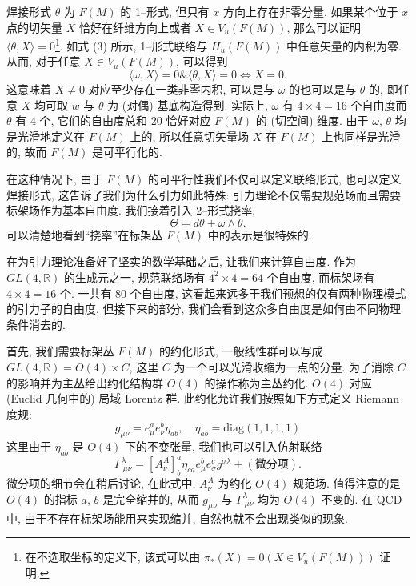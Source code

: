 \documentclass{article}
\begin{document}
焊接形式 $\theta$ 为 $F(M)$ 的 1--形式, 但只有 $x$ 方向上存在非零分量. 如果某个位于 $x$ 点的切矢量 $X$ 恰好在纤维方向上或者 $X\in V_{u}(F(M))$, 那么可以证明 $\langle\theta,X\rangle=0$\footnote{在不选取坐标的定义下, 该式可以由 $\pi_{*}(X)=0(X\in V_{u}(F(M)))$ 证明.}. 如式 (3) 所示, 1--形式联络与 $H_{u}(F(M))$ 中任意矢量的内积为零. 从而, 对于任意 $X\in V_{u}(F(M))$, 可以得到
\begin{equation}
\langle\omega, X\rangle=0\&\langle \theta, X\rangle=0\Leftrightarrow X=0.
\end{equation}
这意味着 $X\neq 0$ 对应至少存在一类非零内积, 可以是与 $\omega$ 的也可以是与 $\theta$ 的, 即任意 $X$ 均可取 $w$ 与 $\theta$ 为 (对偶) 基底构造得到. 实际上, $\omega$ 有 $4\times4=16$ 个自由度而 $\theta$ 有 4 个, 它们的自由度总和 20 恰好对应 $F(M)$ 的 (切空间) 维度. 由于 $\omega$, $\theta$ 均是光滑地定义在 $F(M)$ 上的, 所以任意切矢量场 $X$ 在 $F(M)$ 上也同样是光滑的, 故而 $F(M)$ 是可平行化的.

在这种情况下, 由于 $F(M)$ 的可平行性我们不仅可以定义联络形式, 也可以定义焊接形式, 这告诉了我们为什么引力如此特殊: 引力理论不仅需要规范场而且需要标架场作为基本自由度. 我们接着引入 2--形式挠率,
\begin{equation}
\Theta=d\theta+\omega\wedge \theta.
\end{equation}
可以清楚地看到“挠率”在标架丛 $F(M)$ 中的表示是很特殊的.

在为引力理论准备好了坚实的数学基础之后, 让我们来计算自由度. 作为 $GL(4,\mathbb{R})$ 的生成元之一, 规范联络场有 $4^{2}\times4=64$ 个自由度, 而标架场有 $4\times4=16$ 个. 一共有 80 个自由度, 这看起来远多于我们预想的仅有两种物理模式的引力子的自由度, 但接下来的部分, 我们会看到这众多自由度是如何由不同物理条件消去的.

首先, 我们需要标架丛 $F(M)$ 的约化形式, 一般线性群可以写成  $GL(4,\mathbb{R})=O(4)\times C$, 这里 $C$ 为一个可以光滑收缩为一点的分量. 为了消除 $C$ 的影响并为主丛给出约化结构群 $O(4)$ 的操作称为主丛约化. $O(4)$ 对应 (Euclid 几何中的) 局域 Lorentz 群. 此约化允许我们按照如下方式定义 Riemann 度规:
\begin{equation}
g_{\mu\nu}=e_{\mu}^{a}e^{b}_{\nu}\eta_{ab}, \quad\eta_{ab}=\textrm{diag}(1,1,1,1)
\end{equation}
这里由于 $\eta_{ab}$ 是 $O(4)$ 下的不变张量, 我们也可以引入仿射联络
\begin{equation}
\Gamma_{\ \mu\nu}^{\lambda}=[A_{\nu}^{A}]_{b}^{a}\eta_{ca}e_{\mu}^{b}e_{\sigma}^{c}g^{\sigma\lambda}+(\textrm{微分项}).
\end{equation}
微分项的细节会在稍后讨论, 在此式中, $A_{\nu}^{A}$ 为约化 $O(4)$ 规范场. 值得注意的是 $O(4)$ 的指标 $a$, $b$ 是完全缩并的, 从而 $g_{\mu\nu}$ 与 $\Gamma_{\ \mu\nu}^{\lambda}$ 均为 $O(4)$ 不变的. 在 QCD 中, 由于不存在标架场能用来实现缩并, 自然也就不会出现类似的现象.
\end{document}

